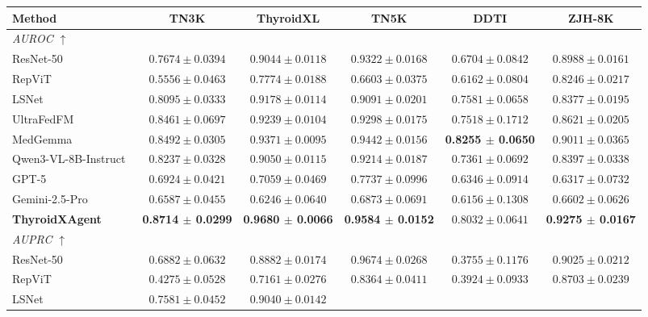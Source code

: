 \begin{table}[p]
\begin{threeparttable}
\begin{tabular}{lccccc}
\toprule
\textbf{Method}
& \textbf{TN3K}
& \textbf{ThyroidXL}
& \textbf{TN5K}
& \textbf{DDTI}
& \textbf{ZJH-8K} \\
\midrule
\multicolumn{6}{l}{\textit{AUROC $\uparrow$}} \\
\midrule
ResNet-50~\cite{he2016deep}
& $0.7674 \pm 0.0394$
& $0.9044 \pm 0.0118$
& $0.9322 \pm 0.0168$
& $0.6704 \pm 0.0842$
& $0.8988 \pm 0.0161$ \\
RepViT~\cite{wang2023repvit}
& $0.5556 \pm 0.0463$
& $0.7774 \pm 0.0188$
& $0.6603 \pm 0.0375$
& $0.6162 \pm 0.0804$
& $0.8246 \pm 0.0217$ \\
LSNet~\cite{wang2025lsnet}
& $0.8095 \pm 0.0333$
& $0.9178 \pm 0.0114$
& $0.9091 \pm 0.0201$
& $0.7581 \pm 0.0658$
& $0.8377 \pm 0.0195$ \\
UltraFedFM~\cite{jiang2025pretraining}
& $0.8461 \pm 0.0697$
& $0.9239 \pm 0.0104$
& $0.9298 \pm 0.0175$
& $0.7518 \pm 0.1712$
& $0.8621 \pm 0.0205$ \\
MedGemma~\cite{sellergren2025medgemma}
& $0.8492 \pm 0.0305$
& $0.9371 \pm 0.0095$
& $0.9442 \pm 0.0156$
& \textbf{0.8255 $\pm$ 0.0650}
& $0.9011 \pm 0.0365$ \\
Qwen3-VL-8B-Instruct~\cite{bai2025qwen3}
& $0.8237 \pm 0.0328$
& $0.9050 \pm 0.0115$
& $0.9214 \pm 0.0187$
& $0.7361 \pm 0.0692$
& $0.8397 \pm 0.0338$ \\
GPT-5~\cite{openai2025gpt5systemcard}
& $0.6924 \pm 0.0421$
& $0.7059 \pm 0.0469$
& $0.7737 \pm 0.0996$
& $0.6346 \pm 0.0914$
& $0.6317 \pm 0.0732$ \\
Gemini-2.5-Pro~\cite{comanici_gemini_2025}
& $0.6587 \pm 0.0455$
& $0.6246 \pm 0.0640$
& $0.6873 \pm 0.0691$
& $0.6156 \pm 0.1308$
& $0.6602 \pm 0.0626$ \\
\rowcolor{lightgray}
\textbf{ThyroidXAgent}
& \textbf{0.8714 $\pm$ 0.0299}
& \textbf{0.9680 $\pm$ 0.0066}
& \textbf{0.9584 $\pm$ 0.0152}
& $0.8032 \pm 0.0641$
& \textbf{0.9275 $\pm$ 0.0167} \\
\midrule
\multicolumn{6}{l}{\textit{AUPRC $\uparrow$}} \\
\midrule
ResNet-50~\cite{he2016deep}
& $0.6882 \pm 0.0632$
& $0.8882 \pm 0.0174$
& $0.9674 \pm 0.0268$
& $0.3755 \pm 0.1176$
& $0.9025 \pm 0.0212$ \\
RepViT~\cite{wang2023repvit}
& $0.4275 \pm 0.0528$
& $0.7161 \pm 0.0276$
& $0.8364 \pm 0.0411$
& $0.3924 \pm 0.0933$
& $0.8703 \pm 0.0239$ \\
LSNet~\cite{wang2025lsnet}
& $0.7581 \pm 0.0452$
& $0.9040 \pm 0.0142$

\end{tabular}
\end{threeparttable}
\end{table}

